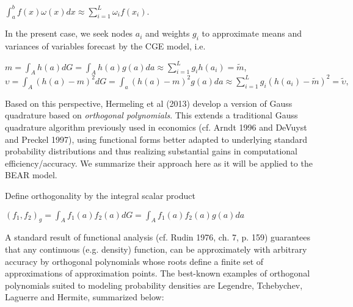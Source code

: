 \documentclass[12pt]{article}
\begin{document}
\begin{center}

$\int^b_a f(x)\omega(x)dx \approx \displaystyle \sum^L_{i=1} \omega_i f(x_i).$

\end{center}

In the present case, we seek nodes $a_i$ and weights $g_i$ to approximate means and variances of variables forecast by the CGE model, i.e.

\begin{center}

$m = \int_A h(a)dG = \int_A h(a)g(a)da \approx \displaystyle \sum^L_{i=1} g_i h(a_i) = \tilde{m}$,\\[20pt]

$\upsilon = \int_A (h(a) - m)^2 dG = \int_a (h(a) - m)^2 g(a)da \approx \displaystyle \sum^L_{i=1} g_i(h(a_i)-\tilde{m})^2 = \tilde{\upsilon},$

\end{center}

Based on this perspective, Hermeling et al (2013) develop a version of Gauss quadrature based on \textit{orthogonal polynomials}. This extends a traditional Gauss quadrature algorithm previously used in economics (cf. Arndt 1996 and DeVuyst and Preckel 1997), using functional forms better adapted to underlying standard probability distributions and thus realizing substantial gains in computational efficiency/accuracy. We summarize their approach here as it will be applied to the BEAR model.

Define orthogonality by the integral scalar product

\begin{center}

$(f_1, f_2)_g = \int_A f_1(a) f_2(a) dG = \int_A f_1(a) f_2(a) g(a) da$

\end{center}

A standard result of functional analysis (cf. Rudin 1976, ch. 7, p. 159) guarantees that any continuous (e.g. density) function, can be approximately with arbitrary accuracy by orthogonal polynomials whose roots define a finite set of approximations of approximation points. The best-known examples of orthogonal polynomials suited to modeling probability densities are Legendre, Tchebychev, Laguerre and Hermite, summarized below:
\end{document}
